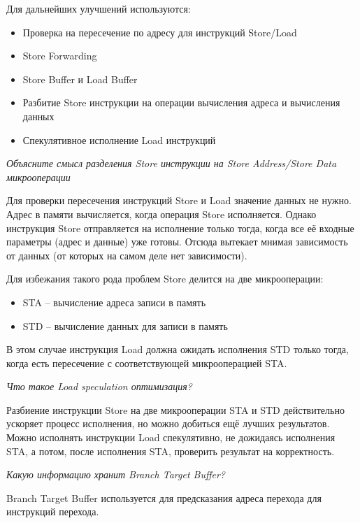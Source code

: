 	Для дальнейших улучшений используются:
	\begin{itemize}
		\item Проверка на пересечение по адресу для инструкций Store/Load
		\item Store Forwarding
		\item Store Buffer и Load Buffer
		\item Разбитие Store инструкции на операции вычисления адреса и вычисления данных
		\item Спекулятивное исполнение Load инструкций
	\end{itemize}
	
	\textit{Объясните смысл разделения Store инструкции на Store Address/Store Data микрооперации}
	
	Для проверки пересечения инструкций Store и Load значение данных не нужно. Адрес в памяти вычисляется, когда операция Store исполняется. Однако инструкция Store отправляется на исполнение только тогда, когда все её входные параметры (адрес и данные) уже готовы. Отсюда вытекает мнимая зависимость от данных (от которых на самом деле нет зависимости).

	Для избежания такого рода проблем Store делится на две микрооперации:
	\begin{itemize}
		\item STA -- вычисление адреса записи в память
		\item STD -- вычисление данных для записи в память
	\end{itemize}
	
	В этом случае инструкция Load должна ожидать исполнения STD только тогда, когда есть пересечение с соответствующей микрооперацией STA.
	
	\textit{Что такое Load speculation оптимизация?}
	
	Разбиение инструкции Store на две микрооперации STA и STD действительно ускоряет процесс исполнения, но можно добиться ещё лучших результатов. Можно исполнять инструкции Load спекулятивно, не дожидаясь исполнения STA, а потом, после исполнения STA, проверить результат на корректность.
	
	
	\newpage

	\textit{Какую информацию хранит Branch Target Buffer?}

	Branch Target Buffer используется для предсказания адреса перехода для инструкций перехода.
	
